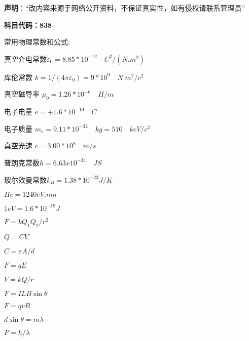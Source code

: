 
\textbf{声明}：“改内容来源于网络公开资料，不保证真实性，如有侵权请联系管理员”


\textbf{科目代码：838}

常用物理常数和公式:

真空介电常数$\varepsilon_0=8.85 *10^{-12} \quad C^2/(N.m^2)$

库伦常数 $k=1/(4\pi \varepsilon_0)=9*10^9 \quad N.m^2/c^2$

真空磁导率 $\mu_0=1.26*10^{-6}\quad H/m$

电子电量 $e=+1.6*10^{-19}\quad C$

电子质量 $m_e=9.11*10^{-32}\quad kg=510 \quad keV/c^2$

真空光速 $c=3.00* 10^8 \quad m/s$

普朗克常数$h=6.63x10^{-34}\quad JS$

玻尔效曼常数$k_B =1.38*10^{-23}J/K$

$Hc=1240 eV.nm$

$1 eV=1.6*10^{-19}J$

$F=k Q_1 Q_2/r^2$

$Q=CV$

$C=\varepsilon A/d$

$F=qE$

$V=kQ/r$

$F=ILB\sin \theta$

$F=qvB$

$d\sin \theta =m\lambda $

$P=h/\lambda$

